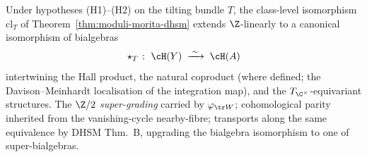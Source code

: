 \begin{theorem}
\label{thm:hall-product-transport-dhsm}
Under hypotheses (H1)--(H2) on the tilting bundle $T$, the class-level isomorphism $\mathrm{cl}_T$ of Theorem~\ref{thm:moduli-morita-dhsm} extends $\Z$-linearly to a canonical isomorphism of bialgebras
\[
 \star_{T} \;\colon\; \cH(Y) \;\xrightarrow{\;\sim\;}\; \cH(A)
\]
intertwining the Hall product, the natural coproduct (where defined; the Davison--Meinhardt localisation of the integration map), and the $T_{\C^\times}$-equivariant structures. The $\Z/2$ \emph{super-grading} carried by $\varphi_{\tr W}$; cohomological parity inherited from the vanishing-cycle nearby-fibre; transports along the same equivalence by DHSM Thm.~B, upgrading the bialgebra isomorphism to one of super-bialgebras.
\end{theorem}

